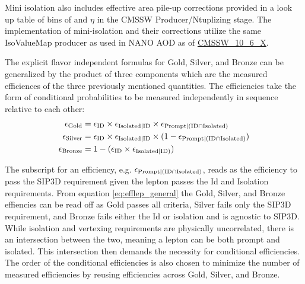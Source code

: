 Mini isolation also includes effective area pile-up corrections provided in a look up table of bins of \pt and $\eta$ in the CMSSW Producer/Ntuplizing stage. The implementation of mini-isolation and their corrections utilize the same IsoValueMap producer as used in NANO AOD as of \url{CMSSW_10_6_X}.


The explicit flavor independent formulas for Gold, Silver, and Bronze can be generalized by the product of three components which are the measured efficiences of the three previously mentioned quantities. The efficiencies take the form of conditional probabilities to be measured independently in sequence relative to each other:
\begin{equation}\label{eq:efflep_general}
\begin{split}
\epsilon_{\text{Gold}}& = \epsilon_{\text{ID}}\times \epsilon_{\text{Isolated}|\text{ID}} \times \epsilon_{\text{Prompt}|(\text{ID} \cap \text{Isolated})} \\
\epsilon_{\text{Silver}}& = \epsilon_{\text{ID}} \times \epsilon_{\text{Isolated}|\text{ID}} \times (1-\epsilon_{\text{Prompt}|(\text{ID} \cap \text{Isolated})}) \\
\epsilon_{\text{Bronze}}& = 1-(\epsilon_{\text{ID}} \times \epsilon_{\text{Isolated}|\text{ID})} )
\end{split}
\end{equation}

The subscript for an efficiency, e.g. $\epsilon_{\text{Prompt}|(\text{ID} \cap \text{Isolated})}$, reads as the efficiency to pass the SIP3D requirement given the lepton passes the Id and Isolation requirements. From equation \ref{eq:efflep_general} the Gold, Silver, and Bronze effiencies can be read off as Gold passes all criteria, Silver fails only the SIP3D requirement, and Bronze fails either the Id or isolation and is agnostic to SIP3D. While isolation and vertexing requirements are physically uncorrelated, there is an intersection between the two, meaning a lepton can be both prompt and isolated. This intersection then demands the necessity for conditional efficiencies.  The order of the conditional efficiencies is also chosen to minimize the number of measured efficiencies by reusing efficiencies across Gold, Silver, and Bronze.  





